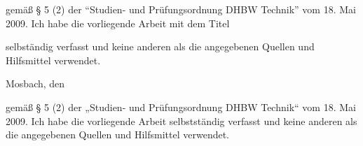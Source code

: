 \pagestyle{empty}

\label{chap:Erklärung}


\vspace*{\fill}


\vspace*{6ex}

\noindent gemäß § 5 (2) der "`Studien- und Prüfungsordnung DHBW Technik"' vom 18. Mai 2009. Ich habe die vorliegende Arbeit mit dem Titel

\vspace*{4ex}

\noindent{\bf\large\mytitle}

\vspace*{4ex}

\noindent selbständig verfasst und keine anderen als die angegebenen Quellen und Hilfsmittel verwendet.

\vspace*{4ex}
\noindent Mosbach, den \mydate\\[3ex]

\noindent\myname

\vspace*{\fill} 


gemäß § 5 (2) der „Studien- und Prüfungsordnung DHBW Technik“ vom 18. Mai 2009.
Ich habe die vorliegende Arbeit selbstständig verfasst und keine anderen als die angegebenen
Quellen und Hilfsmittel verwendet.

